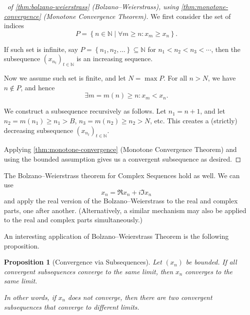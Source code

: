 \documentclass[11pt]{article}
\numberwithin{equation}{section}
\newtheorem{proposition}[theorem]{Proposition}
\theoremstyle{definition}
\theoremstyle{remark}
\newcommand{\pqty}[1]{\left(#1\right)}
\newcommand{\Bqty}[1]{\left\{#1\right\}}
\newcommand{\set}[2]{\left\{#1\mid #2\right\}}
\newcommand{\NN}{\mathbb N}
\begin{document}
\begin{proof}[\proofname\ of \autoref{thm:bolzano-weierstrass} (Bolzano--Weierstrass), using \autoref{thm:monotone-convergence} (Monotone Convergence Theorem)]
    We first consider the set of indices
    \[
        P = \set{n \in \NN}{\forall m \geq n: x_m \geq x_n}.
    \]

    If such set is infinite, say \(P = \Bqty{n_1, n_2, \ldots} \subseteq \NN\) for \(n_1 < n_2 < n_3 < \cdots\), then the subsequence \(\pqty{x_{n_t}}_{t \in \NN}\) is an increasing sequence.

    Now we assume such set is finite, and let \(N = \max P\). For all \(n > N\), we have \(n \notin P\), and hence
    \[
        \exists m = m\pqty{n} \geq n: x_m < x_n.
    \]

    We construct a subsequence recursively as follows. Let \(n_1 = n + 1\), and let \(n_2 = m\pqty{n_1} \geq n_1 > B\), \(n_3 = m\pqty{n_2} \geq n_2 > N\), etc. This creates a (strictly) decreasing subsequence \(\pqty{x_{n_t}}_{t \in \NN}\).

    Applying \autoref{thm:monotone-convergence} (Monotone Convergence Theorem) and using the bounded assumption gives us a convergent subsequence as desired.
\end{proof}

The Bolzano--Weierstrass theorem for Complex Sequences hold as well. We can use
\[
    x_n = \Re x_n + i \Im x_n
\]
and apply the real version of the Bolzano--Weierstrass to the real and complex parts, one after another. (Alternatively, a similar mechanism may also be applied to the real and complex parts simultaneously.)

An interesting application of Bolzano--Weierstrass Theorem is the following proposition.

\begin{proposition}[Convergence via Subsequences]\label{analysis-unit-0021}
    \label{prop:convergence-via-subsequences}%
    Let \(\pqty{x_n}\) be bounded. If all convergent subsequences converge to the same limit, then \(x_n\) converges to the same limit.

    In other words, if \(x_n\) does not converge, then there are two convergent subsequences that converge to different limits.
\end{proposition}
\end{document}
